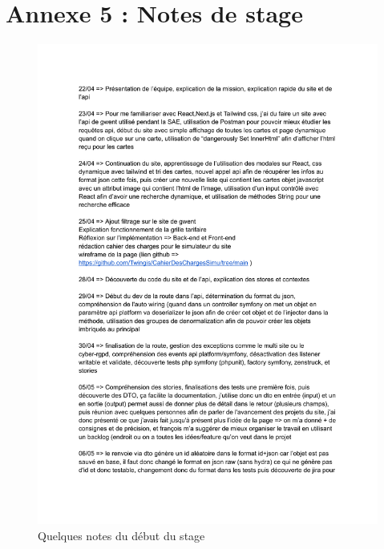 \documentclass[a4paper,12pt]{report}
\begin{document}
\section{Annexe 5 : Notes de stage}
\begin{figure}[H]
    \centering
    \includegraphics[scale=0.6]{Note stage-1.pdf}
    \caption{Quelques notes du début du stage}
    \label{fig:notes}
\end{figure}
\end{document}
